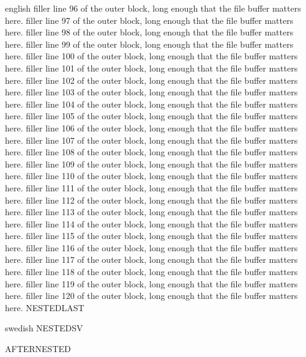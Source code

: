 \documentclass{article}
\begin{document}
\begin{onlyin}{english}
filler line 96 of the outer block, long enough that the file buffer matters here.
filler line 97 of the outer block, long enough that the file buffer matters here.
filler line 98 of the outer block, long enough that the file buffer matters here.
filler line 99 of the outer block, long enough that the file buffer matters here.
filler line 100 of the outer block, long enough that the file buffer matters here.
filler line 101 of the outer block, long enough that the file buffer matters here.
filler line 102 of the outer block, long enough that the file buffer matters here.
filler line 103 of the outer block, long enough that the file buffer matters here.
filler line 104 of the outer block, long enough that the file buffer matters here.
filler line 105 of the outer block, long enough that the file buffer matters here.
filler line 106 of the outer block, long enough that the file buffer matters here.
filler line 107 of the outer block, long enough that the file buffer matters here.
filler line 108 of the outer block, long enough that the file buffer matters here.
filler line 109 of the outer block, long enough that the file buffer matters here.
filler line 110 of the outer block, long enough that the file buffer matters here.
filler line 111 of the outer block, long enough that the file buffer matters here.
filler line 112 of the outer block, long enough that the file buffer matters here.
filler line 113 of the outer block, long enough that the file buffer matters here.
filler line 114 of the outer block, long enough that the file buffer matters here.
filler line 115 of the outer block, long enough that the file buffer matters here.
filler line 116 of the outer block, long enough that the file buffer matters here.
filler line 117 of the outer block, long enough that the file buffer matters here.
filler line 118 of the outer block, long enough that the file buffer matters here.
filler line 119 of the outer block, long enough that the file buffer matters here.
filler line 120 of the outer block, long enough that the file buffer matters here.
NESTEDLAST
\end{onlyin}
\begin{onlyin}{swedish}
NESTEDSV
\end{onlyin}
AFTERNESTED
\end{document}
